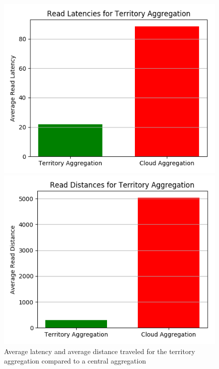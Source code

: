 \begin{figure}[H]
\begin{minipage}{0.49\textwidth}
\centering
\includegraphics[width=1\linewidth]{Figures/Evaluation/read-by-latency-Territory-Aggregation.png}
\end{minipage}
\hfill
\begin{minipage}{0.49\textwidth}
\centering
\includegraphics[width=1\linewidth]{Figures/Evaluation/read-by-distance-Territory-Aggregation.png}
\end{minipage}
\label{fig:read-by-city}
\caption{Average latency and average distance traveled for the territory aggregation compared to a central aggregation}
\end{figure}

